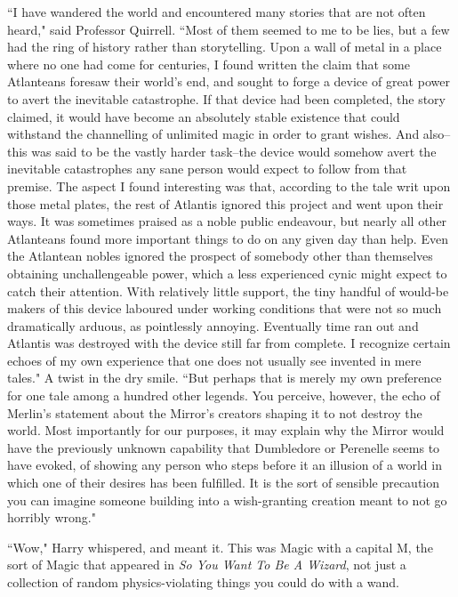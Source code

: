 ``I have wandered the world and encountered many stories that are not often heard," said Professor Quirrell. ``Most of them seemed to me to be lies, but a few had the ring of history rather than storytelling. Upon a wall of metal in a place where no one had come for centuries, I found written the claim that some Atlanteans foresaw their world's end, and sought to forge a device of great power to avert the inevitable catastrophe. If that device had been completed, the story claimed, it would have become an absolutely stable existence that could withstand the channelling of unlimited magic in order to grant wishes. And also\---this was said to be the vastly harder task\---the device would somehow avert the inevitable catastrophes any sane person would expect to follow from that premise. The aspect I found interesting was that, according to the tale writ upon those metal plates, the rest of Atlantis ignored this project and went upon their ways. It was sometimes praised as a noble public endeavour, but nearly all other Atlanteans found more important things to do on any given day than help. Even the Atlantean nobles ignored the prospect of somebody other than themselves obtaining unchallengeable power, which a less experienced cynic might expect to catch their attention. With relatively little support, the tiny handful of would-be makers of this device laboured under working conditions that were not so much dramatically arduous, as pointlessly annoying. Eventually time ran out and Atlantis was destroyed with the device still far from complete. I recognize certain echoes of my own experience that one does not usually see invented in mere tales." A twist in the dry smile. ``But perhaps that is merely my own preference for one tale among a hundred other legends. You perceive, however, the echo of Merlin's statement about the Mirror's creators shaping it to not destroy the world. Most importantly for our purposes, it may explain why the Mirror would have the previously unknown capability that Dumbledore or Perenelle seems to have evoked, of showing any person who steps before it an illusion of a world in which one of their desires has been fulfilled. It is the sort of sensible precaution you can imagine someone building into a wish-granting creation meant to not go horribly wrong."

``Wow," Harry whispered, and meant it. This was Magic with a capital M, the sort of Magic that appeared in \emph{So You Want To Be A Wizard}, not just a collection of random physics-violating things you could do with a wand.

